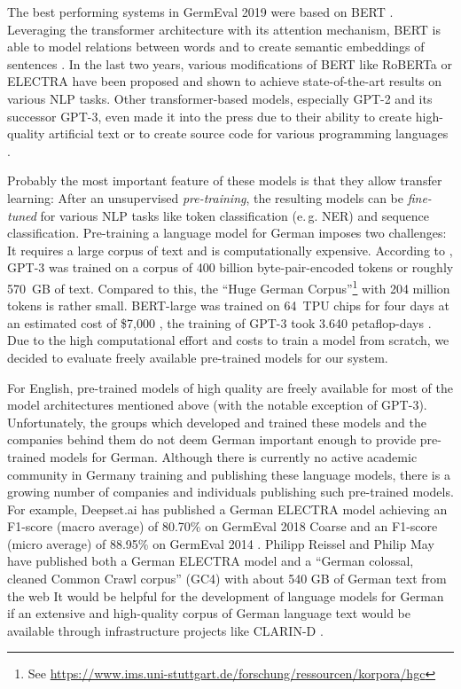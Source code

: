\documentclass[11pt,a4paper]{article}
\begin{document}
The best performing systems in GermEval 2019 were based on BERT \cite{BERT}. 
Leveraging the transformer architecture \cite{transformer} with its attention
mechanism, BERT is able to model relations between words and to create semantic embeddings of sentences 
\cite{DBLP:journals/corr/abs-2007-01852}.  
In the last two years, various modifications of BERT 
like RoBERTa \cite{RoBERTa} or ELECTRA \cite{ELECTRA} have been proposed and shown to achieve state-of-the-art results on 
various NLP tasks. 
Other transformer-based models,
especially GPT-2 \cite{GPT2} and its successor GPT-3, even made it into the press \cite{Zeit_GPT3} due to their ability to create 
high-quality artificial text or to create source code for various programming languages \cite{GPT3-Code}. 

Probably the most important feature of these models is that they allow transfer learning: After an unsupervised \emph{pre-training}, 
the resulting models can be \emph{fine-tuned} for various NLP tasks like token classification (e.\,g. NER) and sequence classification.
Pre-training a language model for German imposes two challenges: It requires a large corpus of text and is computationally expensive.
According to \citet{GPT3}, GPT-3 was trained on a corpus of 400 billion byte-pair-encoded tokens or roughly 570~GB of text.
Compared to this, the ``Huge German Corpus''\footnote{See \url{https://www.ims.uni-stuttgart.de/forschung/ressourcen/korpora/hgc}} with 204 million tokens is 
rather small. 
BERT-large was trained on 64~TPU chips for four days at an estimated cost of \$7,000 \cite{10.1145/3381831}, 
the training of GPT-3 took 3.640 petaflop-days \cite{GPT3}.
Due to the high computational effort and costs to train a model from scratch, we decided to evaluate freely available pre-trained models for our system.

For English, pre-trained models of high quality are freely available for most of the model architectures mentioned above (with the notable exception of GPT-3).
Unfortunately, the groups which developed and trained these models and the companies behind them do not deem German 
important enough to provide pre-trained models for German. 
Although there is currently no active academic community in Germany training and publishing these language models, 
there is a growing number of companies and individuals publishing such pre-trained models.
For example, Deepset.ai has published a German ELECTRA model achieving an F1-score (macro average) of 80.70\% on GermEval 2018 Coarse and 
an F1-score (micro average) of 88.95\% on GermEval 2014 \cite{GNLM}.
Philipp Reissel and Philip May have published both a 
German ELECTRA model \cite{german-nlp-group/electra-base-german-uncased}
and a ``German colossal, cleaned Common Crawl corpus'' (GC4) \cite{GC4} with about 540 GB of German text 
from the web
It would be helpful for the development of language models for German if an extensive and high-quality corpus of German language text would be available 
through infrastructure projects like CLARIN-D \cite{ClarinD}.
\end{document}
